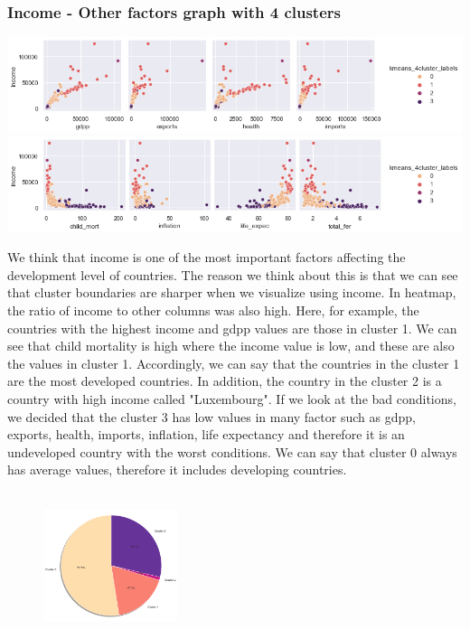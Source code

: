 \documentclass[onecolumn]{article}
\begin{document}
\subsubsection{Income - Other factors graph with 4 clusters}
\begin{center}
    \includegraphics[scale=0.50]{income1.png}
    \includegraphics[scale=0.50]{income2.png}
\end{center}
We think that income is one of the most important factors affecting the development level of countries. The reason we think about this is that we can see that cluster boundaries are sharper when we visualize using income. In heatmap, the ratio of income to other columns was also high. Here, for example, the countries with the highest income and gdpp values are those in cluster 1. We can see that child mortality is high where the income value is low, and these are also the values in cluster 1. Accordingly, we can say that the countries in the cluster 1 are the most developed countries. In addition, the country in the cluster 2 is a country with high income called "Luxembourg". If we look at the bad conditions, we decided that the cluster 3 has low values in many factor such as gdpp, exports, health, imports, inflation, life expectancy and therefore it is an undeveloped country with the worst conditions. We can say that cluster 0 always has average values, therefore it includes developing countries.\\\\

\begin{figure} 
    \vspace{\dimexpr0.05\baselineskip-\topskip}%
    \centering
    \includegraphics[width=0.35\textwidth]{percentage.png}
\end{figure}
\end{document}
